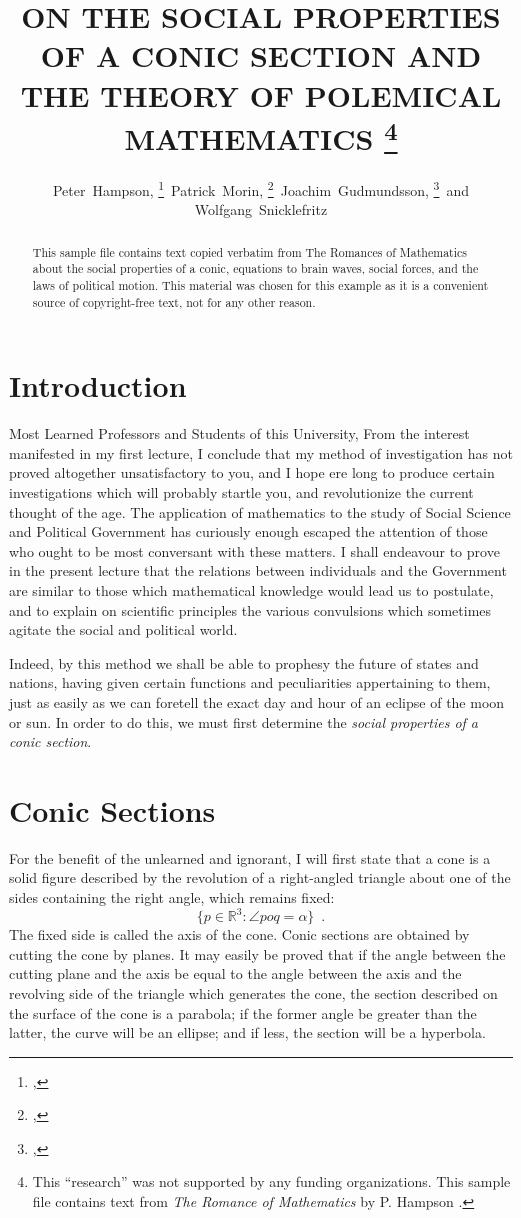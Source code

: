 \documentclass{jocg}
\title{%
  \MakeUppercase{On the Social Properties of a Conic Section
       \newline and the Theory of Polemical Mathematics}%
  \thanks{This ``research'' was not supported by any funding organizations.
    This sample file contains text from \emph{The Romance of Mathematics}
    by P. Hampson \cite{h1886}.}
}
\author{%
  Peter~Hampson,%
  \thanks{\affil{Oxford University}, 
          \email{pete@oxford.com.au.gov.org}}\,
  Patrick~Morin,%
  \thanks{\affil{Carleton University},
          \email{\{morin,wolfie\}@scs.carleton.ca}}\,
  Joachim~Gudmundsson,%
  \thanks{\affil{NICTA}, 
          \email{joachim.gudmundsson@nicta.com.au}}\,
  and Wolfgang~Snicklefritz\footnotemark[3]
}
\theoremstyle{plain}
\theoremstyle{definition}
\begin{document}
\maketitle

\begin{abstract}
This sample file contains text copied verbatim from The Romances
of Mathematics \cite{h1886} about the social properties of a conic,
equations to brain waves, social forces, and the laws of political motion.
This material was chosen for this example as it is a convenient source of
copyright-free text, not for any other reason.
\end{abstract}

\section{Introduction}

Most Learned Professors and Students of this University, From the
interest manifested in my first lecture, I conclude that my method of
investigation has not proved altogether unsatisfactory to you, and I hope
ere long to produce certain investigations which will probably startle
you, and revolutionize the current thought of the age. The application
of mathematics to the study of Social Science and Political Government
has curiously enough escaped the attention of those who ought to be most
conversant with these matters. I shall endeavour to prove in the present
lecture that the relations between individuals and the Government are
similar to those which  mathematical knowledge would lead us to postulate,
and to explain on scientific principles the various convulsions which
sometimes agitate the social and political world.

Indeed, by this method we shall be able to prophesy the future of states
and nations, having given certain functions and peculiarities appertaining
to them, just as easily as we can foretell the exact day and hour of an
eclipse of the moon or sun. In order to do this, we must first determine
the \emph{social properties of a conic section}.

\section{Conic Sections}

For the benefit of the unlearned and ignorant, I will first state that
a cone is a solid figure described by the revolution of a right-angled
triangle about one of the sides containing the right angle, which remains
fixed: 
\[
      \{ p\in\mathbb{R}^3 : \angle poq = \alpha \} \enspace .
\]
The fixed side is called the axis of the cone. Conic sections are
obtained by cutting the cone by planes. It may easily be proved that if
the angle between the cutting plane and the axis be equal to the angle
between the axis and the revolving side of the triangle which generates
the cone, the section described  on the surface of the cone is a parabola;
if the former angle be greater than the latter, the curve will be an
ellipse; and if less, the section will be a hyperbola.
\end{document}
